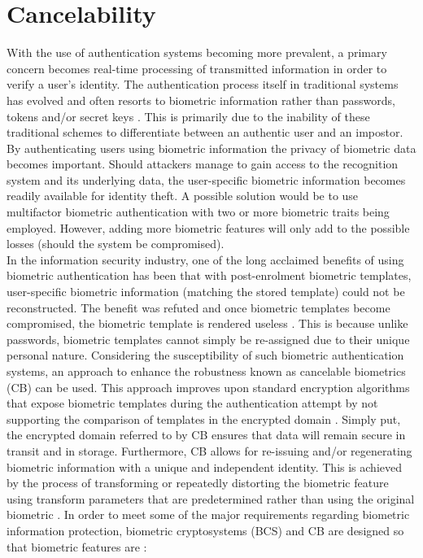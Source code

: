 \section[Cancelability]{Cancelability}
With the use of authentication systems becoming more prevalent, a primary concern becomes real-time processing of transmitted information in order to verify a user’s identity. The authentication process itself in traditional systems has evolved and often resorts to biometric information rather than passwords, tokens and/or secret keys \citep{Verma2016}. This is primarily due to the inability of these traditional schemes to differentiate between an authentic user and an impostor. By authenticating users using biometric information the privacy of biometric data becomes important. Should attackers manage to gain access to the recognition system and its underlying data, the user-specific biometric information becomes readily available for identity theft. 
A possible solution would be to use multifactor biometric authentication with two or more biometric traits being employed. However, adding more biometric features will only add to the possible losses (should the system be compromised). \\ 
In the information security industry, one of the long acclaimed benefits of using biometric authentication has been that with post-enrolment biometric templates, user-specific biometric information (matching the stored template) could not be reconstructed. The benefit was refuted and once biometric templates become compromised, the biometric template is rendered useless \citep{Rathgeb2011}. This is because unlike passwords, biometric templates cannot simply be re-assigned due to their unique personal nature. Considering the susceptibility of such biometric authentication systems, an approach to enhance the robustness known as cancelable biometrics (CB) can be used. This approach improves upon standard encryption algorithms that expose biometric templates during the authentication attempt by not supporting the comparison of templates in the encrypted domain \citep{Rathgeb2011}. Simply put, the encrypted domain referred to by CB ensures that data will remain secure in transit and in storage. Furthermore, CB allows for re-issuing and/or regenerating biometric information with a unique and independent identity. This is achieved by the process of transforming or repeatedly distorting the biometric feature using transform parameters that are predetermined rather than using the original biometric \citep{Shahim2016}. In order to meet some of the major requirements regarding biometric information protection, biometric cryptosystems (BCS) and CB are designed so that biometric features are \citep{Rathgeb2011, Verma2016}:

